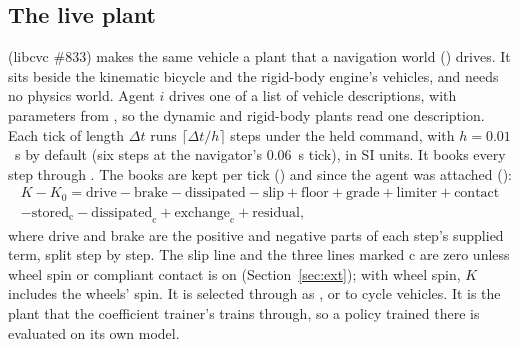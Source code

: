 \documentclass[11pt]{article}
\theoremstyle{remark}
\begin{document}
\subsection{The live plant}
\label{sec:live}
 (libcvc \#833) makes the same vehicle a plant that a
navigation world () drives. It sits beside the kinematic bicycle and
the rigid-body engine's vehicles, and needs no physics world. Agent $i$ drives one of a list of
vehicle descriptions, with parameters from , so the dynamic
and rigid-body plants read one description. Each tick of length $\Delta t$ runs
$\lceil\Delta t/h\rceil$ steps under the held command, with $h=0.01$~s by default (six steps at the
navigator's 0.06~s tick), in SI units. It books every step through . The
books are kept per tick () and since the agent was attached ():
\begin{multline}
  K-K_0=\text{drive}-\text{brake}-\text{dissipated}-\text{slip}+\text{floor}+\text{grade}
  +\text{limiter}+\text{contact}\\
  -\text{stored}_{\mathrm c}-\text{dissipated}_{\mathrm c}+\text{exchange}_{\mathrm c}+\text{residual},
  \label{eq:live-books}
\end{multline}
where drive and brake are the positive and negative parts of each step's supplied term, split step
by step. The slip line and the three lines marked c are zero unless wheel spin or compliant contact
is on (Section~\ref{sec:ext}); with wheel spin, $K$ includes the wheels' spin. It is selected through  as , or
 to cycle vehicles. It is the plant that the coefficient trainer's
 trains through, so a policy trained there is evaluated on its own
model.
\end{document}
